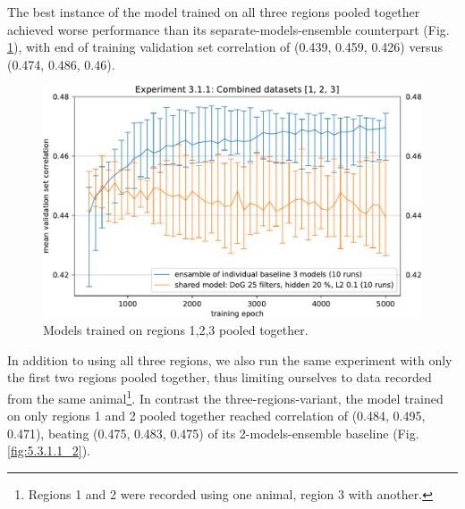 The best instance of the model trained on all three regions pooled together achieved worse performance than its separate-models-ensemble counterpart (Fig. \ref{fig:5.3.1.1_1}), with end of training validation set correlation of (0.439, 0.459, 0.426) versus (0.474, 0.486, 0.46). 

\begin{figure}[H]
    \centering
    \includegraphics[width=1\textwidth]{../figures/05_3_1_1_1}
    \caption[Experiment 3.1.1]{Models trained on regions 1,2,3 pooled together\protect\footnotemark.}
    \label{fig:5.3.1.1_1}
\end{figure}

In addition to using all three regions, we also run the same experiment with only the first two regions pooled together, thus limiting ourselves to data recorded from the same animal\footnote{Regions 1 and 2 were recorded using one animal, region 3 with another.}. In contrast the three-regions-variant, the model trained on only regions 1 and 2 pooled together reached correlation of (0.484, 0.495, 0.471), beating (0.475, 0.483, 0.475) of its 2-models-ensemble baseline (Fig. \ref{fig:5.3.1.1_2}).

